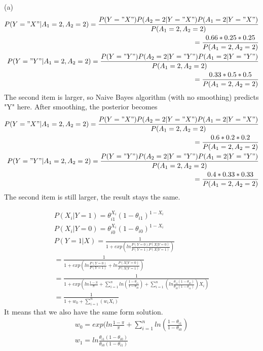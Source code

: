 \documentclass[12pt]{article}
\newenvironment{solution}[2][Solution]{\begin{trivlist}
\item[\hskip \labelsep {\bfseries #1}\hskip \labelsep {\bfseries #2.}]}{\end{trivlist}}
\begin{document}
\begin{solution}{2}
(a)
\begin{align*}
P(Y="X"|A_{1} = 2, A_2 = 2) = \frac{P(Y = "X")P(A_2=2|Y="X")P(A_1=2|Y="X")}{P(A_1 = 2, A_2 = 2)}\\
= \frac{0.66*0.25*0.25}{P(A_1 = 2, A_2 = 2)}\\
P(Y="Y"|A_{1} = 2, A_2 = 2) = \frac{P(Y = "Y")P(A_2=2|Y="Y")P(A_1=2|Y="Y")}{P(A_1 = 2, A_2 = 2)}\\
= \frac{0.33*0.5*0.5}{P(A_1 = 2, A_2 = 2)}
\end{align*}
The second item is larger, so Naive Bayes algorithm (with no smoothing) predicts "Y" here.
After smoothing, the posterior becomes
\begin{align*}
P(Y="X"|A_{1} = 2, A_2 = 2) = \frac{P(Y = "X")P(A_2=2|Y="X")P(A_1=2|Y="X")}{P(A_1 = 2, A_2 = 2)}\\
= \frac{0.6*0.2*0.2}{P(A_1 = 2, A_2 = 2)}\\
P(Y="Y"|A_{1} = 2, A_2 = 2) = \frac{P(Y = "Y")P(A_2=2|Y="Y")P(A_1=2|Y="Y")}{P(A_1 = 2, A_2 = 2)}\\
= \frac{0.4*0.33*0.33}{P(A_1 = 2, A_2 = 2)}
\end{align*}
The second item is still larger, the result stays the same.
\end{solution}

\begin{solution}{3}
\begin{align*}
P(X_{i}|Y=1) = \theta_{i1}^{X_{i}}(1-\theta_{i1})^{1-X_{i}}\\
P(X_{i}|Y=0) = \theta_{i0}^{X_{i}}(1-\theta_{i0})^{1-X_{i}}\\
P(Y=1|X) = \frac{1}{1 + exp(ln\frac{P(Y=0)P(X|Y=0)}{P(Y=1)P(X|Y=1)})}\\
= \frac{1}{1 + exp(ln\frac{P(Y=0)}{P(Y=1)}+ln\frac{P(X|Y=0)}{P(X|Y=1)})}\\
= \frac{1}{1 + exp(ln\frac{1-\pi}{\pi}+\sum_{i=1}^{n}ln(\frac{1-\theta_{i1}}{1-\theta_{i0}})+\sum_{i=1}^{n}(ln\frac{\theta_{i1}(1-\theta_{i0})}{\theta_{i0}(1-\theta_{i1})})X_{i})}\\
=\frac{1}{1 + w_{0}+\sum_{i=1}^{n}(w_{i}X_{i})}
\end{align*}
It means that we also have the same form solution.
\begin{align*}
w_{0} = exp(ln\frac{1-\pi}{\pi}+\sum_{i=1}^{n}ln(\frac{1-\theta_{i1}}{1-\theta_{i0}})\\
w_{1} = ln\frac{\theta_{i1}(1-\theta_{i0})}{\theta_{i0}(1-\theta_{i1})}
\end{align*}
\end{solution}
\end{document}
